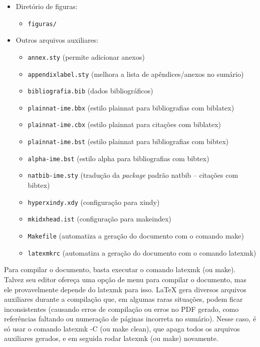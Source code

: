 \begin{itemize}
  \item Diretório de figuras:
  \begin{itemize}
    \item \texttt{figuras/}
  \end{itemize}

  \item Outros arquivos auxiliares:
  \begin{itemize}
    \item \texttt{annex.sty} (permite adicionar anexos)
    \item \texttt{appendixlabel.sty} (melhora a lista de apêndices/anexos no sumário)
    \item \texttt{bibliografia.bib} (dados bibliográficos)
    \item \texttt{plainnat-ime.bbx} (estilo plainnat para bibliografias com biblatex)
    \item \texttt{plainnat-ime.cbx} (estilo plainnat para citações com biblatex)
    \item \texttt{plainnat-ime.bst} (estilo plainnat para bibliografias com bibtex)
    \item \texttt{alpha-ime.bst} (estilo alpha para bibliografias com bibtex)
    \item \texttt{natbib-ime.sty} (tradução da \textit{package} padrão natbib -- citações com bibtex)
    \item \texttt{hyperxindy.xdy} (configuração para xindy)
    \item \texttt{mkidxhead.ist} (configuração para makeindex)
    \item \texttt{Makefile} (automatiza a geração do documento com o comando \textsf{make})
    \item \texttt{latexmkrc} (automatiza a geração do documento com o comando \textsf{latexmk})
  \end{itemize}
\end{itemize}

Para compilar o documento, basta executar o comando \textsf{latexmk} (ou
\textsf{make}). Talvez seu editor ofereça uma opção de menu para compilar o
documento, mas ele provavelmente depende do \textsf{latexmk} para isso.
\LaTeX{} gera diversos arquivos auxiliares durante a compilação que, em
algumas raras situações, podem ficar inconsistentes (causando erros de
compilação ou erros no PDF gerado, como referências faltando ou numeração de
páginas incorreta no sumário). Nesse caso, é só usar o comando
\textsf{latexmk -C} (ou \textsf{make clean}), que apaga todos os arquivos
auxiliares gerados, e em seguida rodar \textsf{latexmk} (ou \textsf{make})
novamente.


